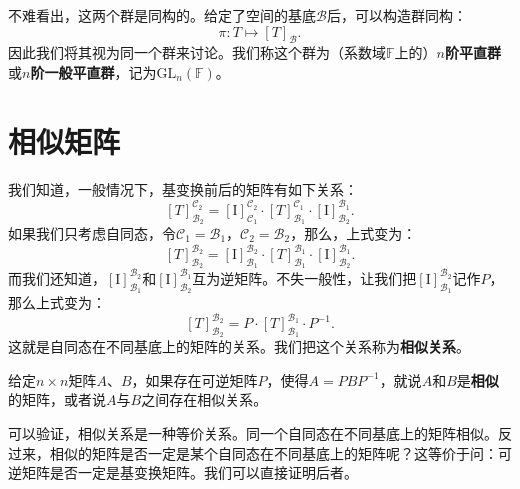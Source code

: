 \documentclass[12pt,UTF8,fontset=none]{ctexbook}
\begin{document}
不难看出，这两个群是同构的。给定了空间的基底$\mathcal{B}$后，可以构造群同构：
$$ \pi : T \mapsto [T]_\mathcal{B}.$$
因此我们将其视为同一个群来讨论。我们称这个群为（系数域$\mathbb{F}$上的）\textbf{$n$阶平直群}或\textbf{$n$阶一般平直群}，记为$\mathrm{GL}_n(\mathbb{F})$。

\section{相似矩阵}

我们知道，一般情况下，基变换前后的矩阵有如下关系：
$$[T]_{\mathcal{B}_2}^{\mathcal{C}_2} = [\mathrm{I}]_{\mathcal{C}_1}^{\mathcal{C}_2} \cdot [T]_{\mathcal{B}_1}^{\mathcal{C}_1} \cdot [\mathrm{I}]_{\mathcal{B}_2}^{\mathcal{B}_1} .$$
如果我们只考虑自同态，令$\mathcal{C}_1 = \mathcal{B}_1$，$\mathcal{C}_2 = \mathcal{B}_2$，那么，上式变为：
$$[T]_{\mathcal{B}_2}^{\mathcal{B}_2} = [\mathrm{I}]_{\mathcal{B}_1}^{\mathcal{B}_2} \cdot [T]_{\mathcal{B}_1}^{\mathcal{B}_1} \cdot [\mathrm{I}]_{\mathcal{B}_2}^{\mathcal{B}_1} .$$
而我们还知道，$[\mathrm{I}]_{\mathcal{B}_1}^{\mathcal{B}_2}$和$ [\mathrm{I}]_{\mathcal{B}_2}^{\mathcal{B}_1}$互为逆矩阵。不失一般性，让我们把$[\mathrm{I}]_{\mathcal{B}_1}^{\mathcal{B}_2}$记作$P$，那么上式变为：
$$[T]_{\mathcal{B}_2}^{\mathcal{B}_2} = P \cdot [T]_{\mathcal{B}_1}^{\mathcal{B}_1} \cdot P^{-1} .$$
这就是自同态在不同基底上的矩阵的关系。我们把这个关系称为\textbf{相似关系}。

\begin{df}\label{df:5_1}
给定$n\times n$矩阵$A$、$B$，如果存在可逆矩阵$P$，使得$A = PBP^{-1}$，就说$A$和$B$是\textbf{相似}的矩阵，或者说$A$与$B$之间存在相似关系。
\end{df}
可以验证，相似关系是一种等价关系。同一个自同态在不同基底上的矩阵相似。反过来，相似的矩阵是否一定是某个自同态在不同基底上的矩阵呢？这等价于问：可逆矩阵是否一定是基变换矩阵。我们可以直接证明后者。
\end{document}
